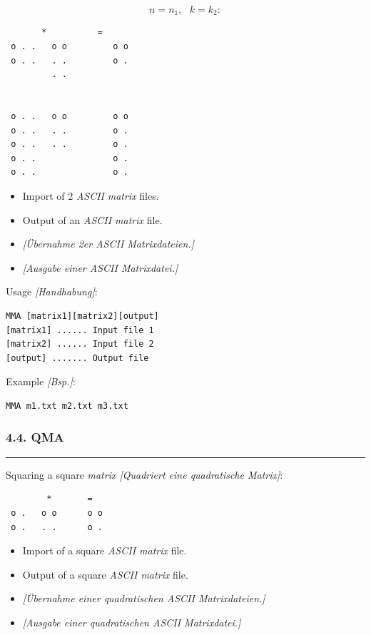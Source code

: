 \documentclass[
]{article}
\begin{document}
\[n = n_{1},\text{\ }k = k_{2}:\]

\begin{verbatim}
       *          =
 o . .   o o         o o
 o . .   . .         o .
         . .
 
 
 o . .   o o         o o
 o . .   . .         o .
 o . .   . .         o .    
 o . .               o .
 o . .               o .
\end{verbatim}

\begin{itemize}
\item
  Import of 2 \emph{ASCII} \emph{matrix} files.
\item
  Output of an \emph{ASCII matrix} file.
\item
  \emph{{[}Übernahme 2er ASCII Matrixdateien.{]}}
\item
  \emph{{[}Ausgabe einer ASCII Matrixdatei.{]}}
\end{itemize}

Usage \emph{{[}Handhabung{]}}:

\begin{verbatim}
MMA [matrix1][matrix2][output] 
[matrix1] ...... Input file 1 
[matrix2] ...... Input file 2 
[output] ....... Output file
\end{verbatim}

Example \emph{{[}Bsp.{]}}:

\begin{verbatim}
MMA m1.txt m2.txt m3.txt
\end{verbatim}

\hypertarget{qma}{%
\subsubsection{4.4. QMA}\label{qma}}

\begin{center}\rule{0.5\linewidth}{0.5pt}\end{center}

Squaring a square \emph{matrix {[}Quadriert eine quadratische
Matrix{]}}:

\begin{verbatim}
        *       =
 o .   o o      o o
 o .   . .      o .
\end{verbatim}

\begin{itemize}
\item
  Import of a square \emph{ASCII matrix} file.
\item
  Output of a square \emph{ASCII matrix} file.
\item
  \emph{{[}Übernahme einer quadratischen ASCII Matrixdateien.{]}}
\item
  \emph{{[}Ausgabe einer quadratischen ASCII Matrixdatei.{]}}
\end{itemize}
\end{document}
